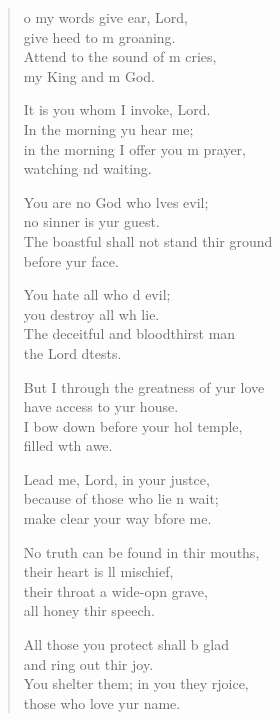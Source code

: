 \settowidth{\versewidth}{you surround him with favour as with a shield.}
\begin{verse}%
  \begin{patverse}
    o my words give ear,  Lord,\Med\\
    give heed to m groaning.\\
    Attend to the sound of m cries,\Med\\
    my King and m God.

It is you whom I invoke,  Lord.\Med\\
    In the morning yu hear me;\\
in the morning I offer you m prayer,\Med\\
    watching nd waiting.

You are no God who lves evil;\Med\\
    no sinner is yur guest.\\
The boastful shall not stand thir ground\Med\\
    before yur face.

You hate all who d evil;\Med\\
    you destroy all wh lie.\\
The deceitful and bloodthirst man\Med\\
    the Lord dtests.

But I through the greatness of yur love\Med\\
    have access to yur house.\\
I bow down before your hol temple,\Med\\
    filled w\pointup{\i}th awe.

Lead me, Lord, in your just\pointup{\i}ce,\Flex\\
    because of those who lie \pointup{\i}n wait;\Med\\
    make clear your way bfore me.

No truth can be found in thir mouths,\Med\\
    their heart is ll mischief,\\
their throat a wide-opn grave,\Med\\
    all honey thir speech.

All those you protect shall b glad\Med\\
    and ring out thir joy.\\
You shelter them; in you they rjoice,\Med\\
    those who love yur name.


\end{patverse}
\end{verse}
